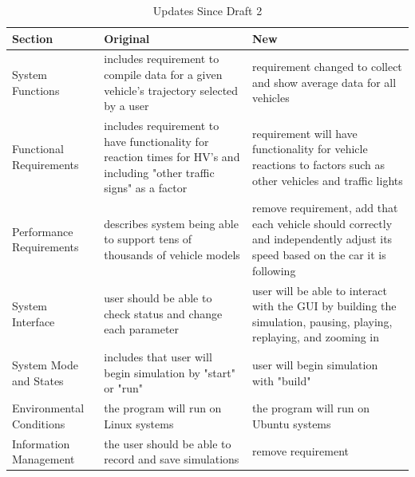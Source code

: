 \documentclass[onecolumn, draftclsnofoot,10pt, compsoc]{IEEEtran}
\begin{document}
\begin{table}[h]
\caption{Updates Since Draft 2}
\begin{tabular}{|l|p{2in}|p{2in}|}
\hline
Section                  & Original  & New \\ \hline
System Functions         & includes requirement to compile data for a given vehicle's trajectory selected by a user                               & requirement changed to collect and show average data for all vehicles                                                          \\ \hline
Functional Requirements  & includes requirement to have functionality for reaction times for HV's and including "other traffic signs" as a factor & requirement will have functionality for vehicle reactions to factors such as other vehicles and traffic lights                 \\ \hline
Performance Requirements & describes system being able to support tens of thousands of vehicle models                                             & remove requirement, add that each vehicle should correctly and independently adjust its speed based on the car it is following \\ \hline
System Interface         & user should be able to check status and change each parameter                                                          & user will be able to interact with the GUI by building the simulation, pausing, playing, replaying, and zooming in             \\ \hline
System Mode and States   & includes that user will begin simulation by "start" or "run"                                                           & user will begin simulation with "build"                                                                                        \\ \hline
Environmental Conditions & the program will run on Linux systems                                                                                  & the program will run on Ubuntu systems                                                                                         \\ \hline
Information Management   & the user should be able to record and save simulations                                                                 & remove requirement                                                                                                             \\ \hline
\end{tabular}
\end{table}
\end{document}
